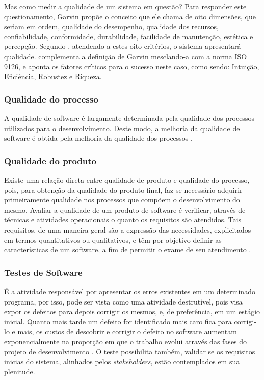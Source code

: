 \documentclass[12pt]{article}
\begin{document}
    Mas como medir a qualidade de um sistema em questão? Para responder este questionamento, Garvin \cite{garvin1987competing} propõe o conceito que ele chama de
    oito dimensões, que seriam em ordem, qualidade do desempenho, qualidade dos recursos, confiabilidade, conformidade, durabilidade, facilidade de manutenção,
    estética e percepção. Segundo \citeauthor{garvin1987competing}, atendendo a estes oito critérios, o sistema apresentará qualidade.
    \citeauthor{pressman2011engenharia} \cite{pressman2011engenharia} complementa a definição de Garvin mesclando-a com a norma ISO 9126, e aponta os fatores
    críticos para o sucesso neste caso, como sendo: Intuição, Eficiência, Robustez e Riqueza.

	
	\subsubsection{Qualidade do processo}
	
	A qualidade de software é largamente determinada pela qualidade dos processos utilizados para o desenvolvimento. Deste modo, a melhoria 
	da qualidade de software é obtida pela melhoria da qualidade dos processos \cite{koscianski2007qualidade}. 
	
	\subsubsection{Qualidade do produto}

	Existe uma relação direta entre qualidade de produto e qualidade do processo, pois, para obtenção da qualidade do produto final,
	faz-se necessário adquirir primeiramente qualidade nos processos que compõem o desenvolvimento do mesmo.
	Avaliar a qualidade de um produto de software é verificar, através de técnicas e atividades operacionais o quanto os requisitos são atendidos. Tais requisitos,
	de uma maneira geral são a expressão das necessidades, explicitados em termos quantitativos ou qualitativos, e têm por objetivo definir as características de
	um software, a fim de permitir o exame de seu atendimento \cite{koscianski2007qualidade}.
	
	\subsubsection{Testes de Software}

	É a atividade responsável por apresentar os erros existentes em um determinado programa, por isso, pode ser vista como uma atividade destrutível, pois visa expor os defeitos para depois corrigir os mesmos, e, de preferência, em um estágio inicial. Quanto mais tarde um defeito for identificado mais caro fica para corrigi-lo e mais, os custos de descobrir e corrigir o defeito no software aumentam exponencialmente na proporção em que o trabalho evolui através das fases do projeto de desenvolvimento \cite{boehm1976quantitative}. O teste possibilita também, validar se os requisitos inicias do sistema, alinhados pelos \emph{stakeholders}, estão contemplados em sua plenitude.
\end{document}
